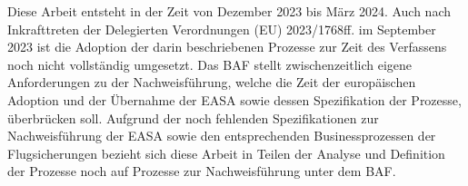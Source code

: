 Diese Arbeit entsteht in der Zeit von Dezember 2023 bis März 2024.
Auch nach Inkrafttreten der Delegierten Verordnungen (EU) 2023/1768ff. im September 2023 ist die Adoption der darin beschriebenen Prozesse zur Zeit des Verfassens noch nicht vollständig umgesetzt. 
Das \ac{BAF} stellt zwischenzeitlich eigene Anforderungen zu der Nachweisführung, welche die Zeit der europäischen Adoption und der Übernahme der \ac{EASA} sowie dessen Spezifikation der Prozesse, überbrücken soll.
Aufgrund der noch fehlenden Spezifikationen zur Nachweisführung der \ac{EASA} sowie den entsprechenden Businessprozessen der Flugsicherungen bezieht sich diese Arbeit in Teilen der Analyse und Definition der Prozesse noch auf Prozesse zur Nachweisführung unter dem \ac{BAF}. 




